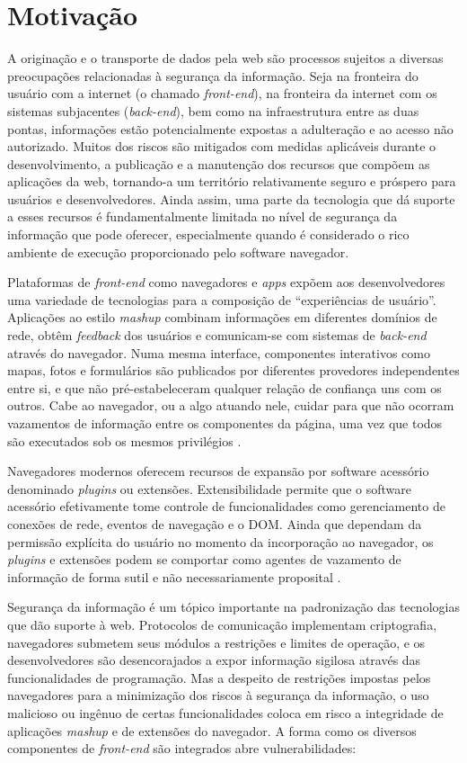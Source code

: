 \section{Motivação}
A originação e o transporte de dados pela web são processos sujeitos a diversas preocupações relacionadas à segurança da informação. Seja na fronteira do usuário com a internet (o chamado \textit{front-end}), na fronteira da internet com os sistemas subjacentes (\textit{back-end}), bem como na infraestrutura entre as duas pontas, informações estão potencialmente expostas a adulteração e ao acesso não autorizado. Muitos dos riscos são mitigados com medidas aplicáveis durante o desenvolvimento, a publicação e a manutenção dos recursos que compõem as aplicações da web, tornando-a um território relativamente seguro e próspero para usuários e desenvolvedores. Ainda assim, uma parte da tecnologia que dá suporte a esses recursos é fundamentalmente limitada no nível de segurança da informação que pode oferecer, especialmente quando é considerado o rico ambiente de execução proporcionado pelo software navegador.

Plataformas de \textit{front-end} como navegadores e \textit{apps} expõem aos desenvolvedores uma variedade de tecnologias para a composição de ``experiências de usuário''. Aplicações ao estilo \textit{mashup} combinam informações em diferentes domínios de rede, obtêm \textit{feedback} dos usuários e comunicam-se com sistemas de \textit{back-end} através do navegador. Numa mesma interface, componentes interativos como mapas, fotos e formulários são publicados por diferentes provedores independentes entre si, e que não pré-estabeleceram qualquer relação de confiança uns com os outros. Cabe ao navegador, ou a algo atuando nele, cuidar para que não ocorram vazamentos de informação entre os componentes da página, uma vez que todos são executados sob os mesmos privilégios \cite[p. 2-3]{DeRyck2012}.

Navegadores modernos oferecem recursos de expansão por software acessório denominado \textit{plugins} ou extensões. Extensibilidade permite que o software acessório efetivamente tome controle de funcionalidades como gerenciamento de conexões de rede, eventos de navegação e o DOM. Ainda que dependam da permissão explícita do usuário no momento da incorporação ao navegador, os \textit{plugins} e extensões podem se comportar como agentes de vazamento de informação de forma sutil e não necessariamente proposital \cite{Heule2015}.

Segurança da informação é um tópico importante na padronização das tecnologias que dão suporte à web. Protocolos de comunicação implementam criptografia, navegadores submetem seus módulos a restrições e limites de operação, e os desenvolvedores são desencorajados a expor informação sigilosa através das funcionalidades de programação. Mas a despeito de restrições impostas pelos navegadores para a minimização dos riscos à segurança da informação, o uso malicioso ou ingênuo de certas funcionalidades coloca em risco a integridade de aplicações \textit{mashup} e de extensões do navegador. A forma como os diversos componentes de \textit{front-end} são integrados abre vulnerabilidades:


